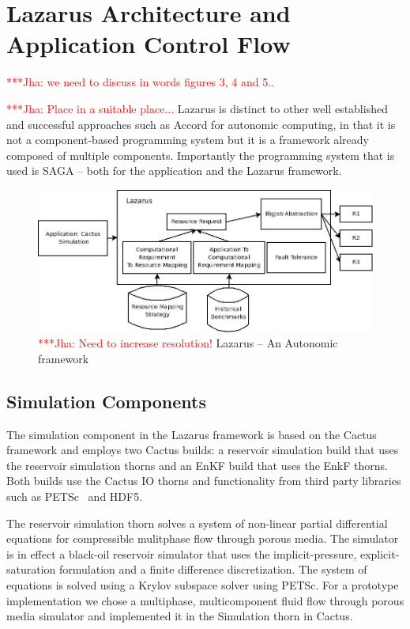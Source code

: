 \documentclass[conference,final]{IEEEtran}
\newcommand{\jhanote}[1]{ {\textcolor{red} { ***Jha: #1 }}}
\newcommand{\jhanote}[1]{}
\begin{document}
\section{Lazarus Architecture and Application Control Flow}

\jhanote{we need to discuss in words figures 3, 4 and 5..}

\jhanote{Place in a suitable place...}  Lazarus is distinct to other
well established and successful approaches such as Accord for
autonomic computing, in that it is not a component-based programming
system but it is a framework already composed of multiple
components. Importantly the programming system that is used is SAGA --
both for the application and the Lazarus framework.

\begin{figure}
\begin{center}
\includegraphics[scale=0.3]{./figures/Lazarus_01.jpeg}
\end{center}
\caption{\jhanote{Need to increase resolution!}  Lazarus -- An
  Autonomic framework}

\label{fig:application_architecture}
\end{figure}


\subsection{Simulation Components}
The simulation component in the Lazarus framework is based on the Cactus
framework and employs two Cactus builds: a reservoir simulation build
that uses the reservoir simulation thorns and an EnKF build that
uses the EnkF thorns. Both builds use the Cactus IO thorns and functionality
from third party libraries such as PETSc~\cite{PETSc} and HDF5.

The reservoir simulation thorn solves a system of non-linear partial differential
equations for compressible mulitphase flow through porous media. The
simulator is in effect a black-oil reservoir simulator that uses
the implicit-pressure, explicit-saturation formulation and a
finite difference discretization. The system of equations is solved
using a Krylov subspace solver using PETSc. For a prototype
implementation we chose a multiphase, multicomponent fluid flow
through porous media simulator and implemented it in the Simulation
thorn in Cactus.
\end{document}
